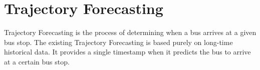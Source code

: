\section{Trajectory Forecasting} \label{sec:problems-trajectory-forecasting}
Trajectory Forecasting is the process of determining when a bus arrives at a given bus stop.
The existing Trajectory Forecasting is based purely on long-time historical data.
It provides a single timestamp when it predicts the bus to arrive at a certain bus stop.

